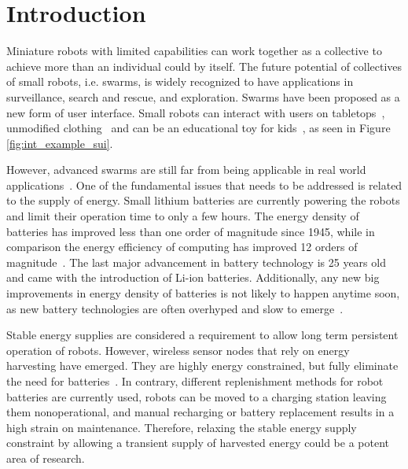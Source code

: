 \chapter{Introduction}
\label{chp:introduction}




Miniature robots with limited capabilities can work together as a collective to achieve more than an individual could by itself.
The future potential of collectives of small robots, i.e. swarms, is widely recognized to have applications in surveillance, search and rescue, and exploration.
Swarms have been proposed as a new form of user interface.
Small robots can interact with users on tabletops~\cite{legoc_uist_2016}, unmodified clothing~\cite{dementyev_uist_2016} and can be an educational toy for kids~\cite{sony_toio_2017}, as seen in Figure \ref{fig:int_example_sui}.


However, advanced swarms are still far from being applicable in real world applications~\cite{barca_sekercioglu_2013}. 
One of the fundamental issues that needs to be addressed is related to the supply of energy.
Small lithium batteries are currently powering the robots and limit their operation time to only a few hours. 
The energy density of batteries has improved less than one order of magnitude since 1945, while in comparison the energy efficiency of computing has improved 12 orders of magnitude~\cite{patel_pvc_2017}.
The last major advancement in battery technology is 25 years old and came with the introduction of Li-ion batteries.
Additionally, any new big improvements in energy density of batteries is not likely to happen anytime soon, as new battery technologies are often overhyped and slow to emerge~\cite{zachary_spec_2016}.



Stable energy supplies are considered a requirement to allow long term persistent operation of robots.
However, wireless sensor nodes that rely on energy harvesting have emerged.
They are highly energy constrained, but fully eliminate the need for batteries~\cite{wisp5_wiki_2017}.
In contrary, different replenishment methods for robot batteries are currently used, robots can be moved to a charging station leaving them nonoperational, and manual recharging or battery replacement results in a high strain on maintenance.
Therefore, relaxing the stable energy supply constraint by allowing a transient supply of harvested energy could be a potent area of research.

